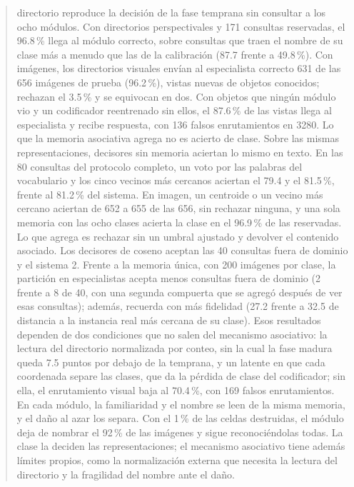 \documentclass[11pt]{article}
\begin{document}
\begin{abstract}
directorio reproduce la decisión de la fase temprana sin consultar a los ocho módulos.
Con directorios perspectivales y 171 consultas reservadas, el 96.8\,\% llega al módulo
correcto, sobre consultas que traen el nombre de su clase más a menudo que las de la
calibración (87.7 frente a 49.8\,\%).
Con imágenes, los directorios visuales envían al especialista correcto 631 de las 656
imágenes de prueba (96.2\,\%), vistas nuevas de objetos conocidos; rechazan el 3.5\,\% y
se equivocan en dos.
Con objetos que ningún módulo vio y un codificador reentrenado sin ellos, el 87.6\,\% de
las vistas llega al especialista y recibe respuesta, con 136 falsos enrutamientos en 3280.
Lo que la memoria asociativa agrega no es acierto de clase.
Sobre las mismas representaciones, decisores sin memoria aciertan lo mismo en texto.
En las 80 consultas del protocolo completo, un voto por las palabras del vocabulario y los
cinco vecinos más cercanos aciertan el 79.4 y el 81.5\,\%, frente al 81.2\,\% del
sistema.
En imagen, un centroide o un vecino más cercano aciertan de 652 a 655 de las 656, sin
rechazar ninguna, y una sola memoria con las ocho clases acierta la clase en el
96.9\,\% de las reservadas.
Lo que agrega es rechazar sin un umbral ajustado y devolver el contenido asociado.
Los decisores de coseno aceptan las 40 consultas fuera de dominio y el sistema 2.
Frente a la memoria única, con 200 imágenes por clase, la partición en especialistas
acepta menos consultas fuera de dominio (2 frente a 8 de 40, con una segunda compuerta
que se agregó después de ver esas consultas); además, recuerda con más fidelidad
(27.2 frente a 32.5 de distancia a la instancia real más cercana de su clase).
Esos resultados dependen de dos condiciones que no salen del mecanismo asociativo: la
lectura del directorio normalizada por conteo, sin la cual la fase madura queda 7.5
puntos por debajo de la temprana, y un latente en que cada coordenada separe las clases,
que da la pérdida de clase del codificador; sin ella, el enrutamiento visual baja al
70.4\,\%, con 169 falsos enrutamientos.
En cada módulo, la familiaridad y el nombre se leen de la misma memoria, y el daño al
azar los separa.
Con el 1\,\% de las celdas destruidas, el módulo deja de nombrar el 92\,\% de las
imágenes y sigue reconociéndolas todas.
La clase la deciden las representaciones; el mecanismo asociativo tiene además límites
propios, como la normalización externa que necesita la lectura del directorio y la
fragilidad del nombre ante el daño.
\end{abstract}

\tableofcontents
\newpage











\end{document}
